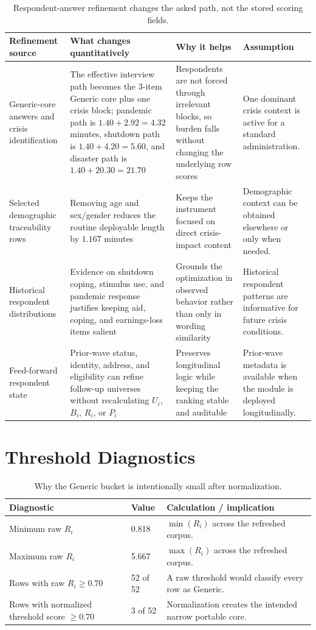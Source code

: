 \documentclass[12pt]{article}
\begin{document}
\begin{table}[H]
\centering
\small
\begin{tabularx}{\textwidth}{L{0.22\textwidth} Y Y Y}
\toprule
Refinement source & What changes quantitatively & Why it helps & Assumption \\
\midrule
Generic-core answers and crisis identification & The effective interview path becomes the 3-item Generic core plus one crisis block; pandemic path is $1.40 + 2.92 = 4.32$ minutes, shutdown path is $1.40 + 4.20 = 5.60$, and disaster path is $1.40 + 20.30 = 21.70$ & Respondents are not forced through irrelevant blocks, so burden falls without changing the underlying row scores & One dominant crisis context is active for a standard administration. \\
Selected demographic traceability rows & Removing age and sex/gender reduces the routine deployable length by $1.167$ minutes & Keeps the instrument focused on direct crisis-impact content & Demographic context can be obtained elsewhere or only when needed. \\
Historical respondent distributions & Evidence on shutdown coping, stimulus use, and pandemic response justifies keeping aid, coping, and earnings-loss items salient & Grounds the optimization in observed behavior rather than only in wording similarity & Historical respondent patterns are informative for future crisis conditions. \\
Feed-forward respondent state & Prior-wave status, identity, address, and eligibility can refine follow-up universes without recalculating $U_i$, $B_i$, $R_i$, or $P_i$ & Preserves longitudinal logic while keeping the ranking stable and auditable & Prior-wave metadata is available when the module is deployed longitudinally. \\
\bottomrule
\end{tabularx}
\caption{Respondent-answer refinement changes the asked path, not the stored scoring fields.}
\end{table}

\section{Threshold Diagnostics}

\begin{table}[H]
\centering
\begin{tabularx}{\textwidth}{L{0.36\textwidth} R{0.12\textwidth} Y}
\toprule
Diagnostic & Value & Calculation / implication \\
\midrule
Minimum raw $R_i$ & 0.818 & $\min(R_i)$ across the refreshed corpus. \\
Maximum raw $R_i$ & 5.667 & $\max(R_i)$ across the refreshed corpus. \\
Rows with raw $R_i \geq 0.70$ & 52 of 52 & A raw threshold would classify every row as Generic. \\
Rows with normalized threshold score $\geq 0.70$ & 3 of 52 & Normalization creates the intended narrow portable core. \\
\bottomrule
\end{tabularx}
\caption{Why the Generic bucket is intentionally small after normalization.}
\end{table}
\end{document}

